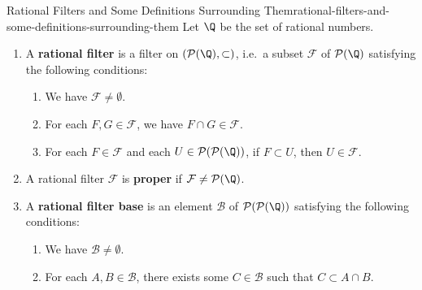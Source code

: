 \begin{definition}{Rational Filters and Some Definitions Surrounding Them}{rational-filters-and-some-definitions-surrounding-them}%
    Let $\Q$ be the set of rational numbers.
    \begin{enumerate}
        \item\label{rational-filters-and-some-definitions-surrounding-them-rational-filters}A \textbf{rational filter} is a filter on $(\mathcal{P}(\Q),\subset)$, i.e.\ a subset $\mathcal{F}$ of $\mathcal{P}(\Q)$ satisfying the following conditions:
            \begin{enumerate}
                \item\label{rational-filters-and-some-definitions-surrounding-them-rational-filters-a}We have $\mathcal{F}\neq\emptyset$.
                \item\label{rational-filters-and-some-definitions-surrounding-them-rational-filters-b}For each $F,G\in\mathcal{F}$, we have $F\cap G\in\mathcal{F}$.
                \item\label{rational-filters-and-some-definitions-surrounding-them-rational-filters-c}For each $F\in\mathcal{F}$ and each $U\in\mathcal{P}(\mathcal{P}(\Q))$, if $F\subset U$, then $U\in\mathcal{F}$.
            \end{enumerate}
        \item\label{rational-filters-and-some-definitions-surrounding-them-proper-rational-filters}A rational filter $\mathcal{F}$ is \textbf{proper} if $\mathcal{F}\neq\mathcal{P}(\Q)$.
        \item\label{rational-filters-and-some-definitions-surrounding-them-rational-filter-bases}A \textbf{rational filter base} is an element $\mathcal{B}$ of $\mathcal{P}(\mathcal{P}(\Q))$ satisfying the following conditions:
            \begin{enumerate}
                \item\label{rational-filters-and-some-definitions-surrounding-them-rational-filter-bases-a}We have $\mathcal{B}\neq\emptyset$.
                \item\label{rational-filters-and-some-definitions-surrounding-them-rational-filter-bases-b}For each $A,B\in\mathcal{B}$, there exists some $C\in\mathcal{B}$ such that $C\subset A\cap B$.

\end{enumerate}
\end{enumerate}
\end{definition}
